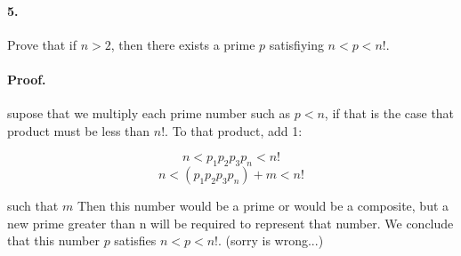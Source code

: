 \documentclass{article}
\begin{document}
\paragraph{5.} Prove that if $n>2$, then there exists a prime $p$ satisfiying $n<p<n!$.

\paragraph{Proof.} supose that we multiply each prime number such as  $p<n$, if that is the case that product must be less than $n!$. To that product, add 1:

$$n < p_1 p_2 p_3 p_n < n!$$
$$n < (p_1 p_2 p_3 p_n) + m < n!$$

such that $m$ Then this number would be a prime or would be a composite, but a new prime greater than n will be required to represent that number. We conclude that this number $p$ satisfies  $n < p < n!$. (sorry is wrong...)
\end{document}

